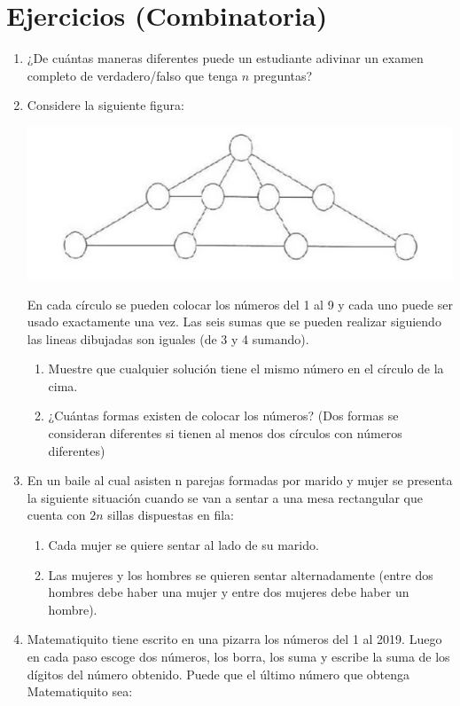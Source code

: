 \documentclass{book}
\begin{document}
\section{Ejercicios (Combinatoria)}
\begin{enumerate}
    \item ¿De cuántas maneras diferentes puede un estudiante adivinar un examen completo de verdadero/falso que tenga $n$ preguntas?
    \item Considere la siguiente figura:
          \begin{center}
              \includegraphics[scale=1]{imagenes/Combinatoria/1,1.png}
          \end{center}
          En cada círculo se pueden colocar los números del 1 al 9 y cada uno puede ser usado exactamente una vez. Las seis sumas que se pueden realizar siguiendo las lineas dibujadas son iguales (de 3 y 4 sumando).
          \begin{enumerate}
              \item Muestre que cualquier solución tiene el mismo número en el círculo de la cima.
              \item ¿Cuántas formas existen de colocar los números? (Dos formas se consideran diferentes si tienen al menos dos círculos con números diferentes)
          \end{enumerate}
    \item En un baile al cual asisten n parejas formadas por marido y mujer se presenta la siguiente situación cuando se van a sentar a una mesa rectangular que cuenta con $2n$ sillas dispuestas en fila:
          \begin{enumerate}
              \item Cada mujer se quiere sentar al lado de su marido.
              \item Las mujeres y los hombres se quieren sentar alternadamente (entre dos hombres debe haber una mujer y entre dos mujeres debe haber un hombre).
          \end{enumerate}
    \item Matematiquito tiene escrito en una pizarra los números del 1 al 2019. Luego en cada paso escoge dos números, los borra, los suma y escribe la suma de los dígitos del número obtenido. Puede que el último número que obtenga Matematiquito sea:

\end{enumerate}
\end{document}
